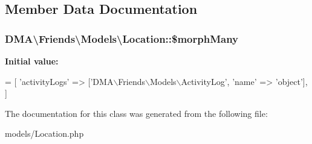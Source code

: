 \subsection{Member Data Documentation}
\hypertarget{classDMA_1_1Friends_1_1Models_1_1Location_a94915d02afa4db52780159b84d9ce12e}{
\subsubsection[{\$morph\+Many}]{\setlength{\rightskip}{0pt plus 5cm}D\+M\+A\textbackslash{}\+Friends\textbackslash{}\+Models\textbackslash{}\+Location\+::\$morph\+Many}}\label{classDMA_1_1Friends_1_1Models_1_1Location_a94915d02afa4db52780159b84d9ce12e}
{\bfseries Initial value\+:}
\begin{DoxyCode}
= [ 
        \textcolor{stringliteral}{'activityLogs'}  => [\textcolor{stringliteral}{'DMA\(\backslash\)Friends\(\backslash\)Models\(\backslash\)ActivityLog'}, \textcolor{stringliteral}{'name'} => \textcolor{stringliteral}{'object'}],
    ]
\end{DoxyCode}


The documentation for this class was generated from the following file\+:\begin{DoxyCompactItemize}
\item 
models/Location.\+php\end{DoxyCompactItemize}
